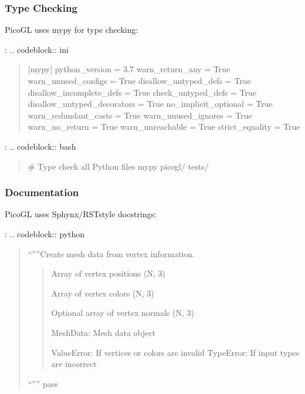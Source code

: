\documentclass[a4paper,10pt,english,openany,oneside]{sphinxmanual}
\begin{document}
\subsubsection{Type Checking}
\label{\detokenize{contributing:type-checking}}
\sphinxAtStartPar
PicoGL uses mypy for type checking:

\sphinxAtStartPar
{}:
.. code\sphinxhyphen{}block:: ini
\begin{quote}

\sphinxAtStartPar
{[}mypy{]}
python\_version = 3.7
warn\_return\_any = True
warn\_unused\_configs = True
disallow\_untyped\_defs = True
disallow\_incomplete\_defs = True
check\_untyped\_defs = True
disallow\_untyped\_decorators = True
no\_implicit\_optional = True
warn\_redundant\_casts = True
warn\_unused\_ignores = True
warn\_no\_return = True
warn\_unreachable = True
strict\_equality = True
\end{quote}

\sphinxAtStartPar
{}:
.. code\sphinxhyphen{}block:: bash
\begin{quote}

\sphinxAtStartPar
\# Type check all Python files
mypy picogl/ tests/
\end{quote}


\subsubsection{Documentation}
\label{\detokenize{contributing:documentation}}
\sphinxAtStartPar
PicoGL uses Sphynx/RST\sphinxhyphen{}style docstrings:

\sphinxAtStartPar
{}:
.. code\sphinxhyphen{}block:: python
\begin{quote}
\begin{description}
\sphinxAtStartPar
“””Create mesh data from vertex information.
\begin{quote}\begin{description}
\sphinxAtStartPar
Array of vertex positions (N, 3)

\sphinxAtStartPar
Array of vertex colors (N, 3)

\sphinxAtStartPar
Optional array of vertex normals (N, 3)

\sphinxAtStartPar
MeshData: Mesh data object

\sphinxAtStartPar
ValueError: If vertices or colors are invalid
TypeError: If input types are incorrect

\end{description}\end{quote}

\sphinxAtStartPar
“””
pass

\end{description}
\end{quote}
\end{document}
